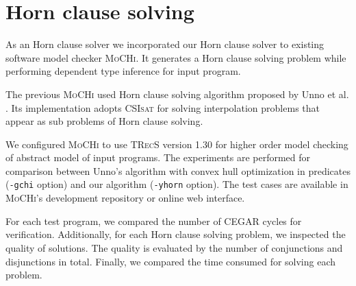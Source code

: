 \section{Horn clause solving}

As an Horn clause solver we incorporated our Horn clause solver to
existing software model checker \textsc{MoCHi}.  It generates a Horn
clause solving problem while performing dependent type inference for
input program.

The previous \textsc{MoCHi} used Horn clause solving algorithm
proposed by Unno et al. \cite{conf/ppdp/UnnoK09}.  Its implementation
adopts \textsc{CSIsat} for solving interpolation problems that appear
as sub problems of Horn clause solving.

We configured \textsc{MoCHi} to use \textsc{TRecS} version 1.30 for
higher order model checking of abstract model of input programs.  The
experiments are performed for comparison between Unno's algorithm with
convex hull optimization in predicates (\texttt{-gchi} option) and our
algorithm (\texttt{-yhorn} option).  The test cases are available in
\textsc{MoCHi}'s development repository or online web interface.

For each test program, we compared the number of CEGAR cycles for
verification.  Additionally, for each Horn clause solving problem, we
inspected the quality of solutions.  The quality is evaluated by the
number of conjunctions and disjunctions in total.  Finally, we
compared the time consumed for solving each problem.


